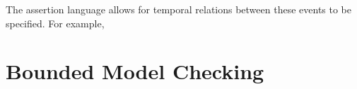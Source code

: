 The assertion language allows for temporal relations between these events to be
specified. For example,

\section{Bounded Model Checking}

\iffalse

\begin{figure}[ht]
  \centering
  \begin{tikzpicture}[>=latex',initial text={},
                      node distance=3cm,on grid,auto]
    \node[state,initial,accepting] (only) [] {};
    \node [draw,dashed,fit=(only),inner sep=0.3cm] {};
  \end{tikzpicture}
  \caption{Null Assertion}
  \label{fig:gv}
\end{figure}

\begin{figure}[ht]
  \centering
  \begin{tikzpicture}[>=latex',initial text={},
                      node distance=3cm,on grid,auto]
    \node[state,initial] (start) [] {};
    \node[state,accepting] (end) [right=of start] {};
    \node[draw,dashed,fit=(start) (end), inner sep=0.3cm] {};
    \path[->] (start) edge node {event} (end);
  \end{tikzpicture}
  \caption{Single Event Automaton}
  \label{fig:gv}
\end{figure}

\begin{figure}[ht]
  \centering
  \begin{tikzpicture}[>=latex',initial text={},
                      node distance=3cm,on grid,auto]
    \node[state,initial] (start) [] {};
    \node[state,accepting] (end) [right=of start] {};
    \node[draw,dashed,fit=(start) (end), inner sep=0.3cm] {};
    \path[->] (start) edge node {event} (end);
  \end{tikzpicture}
  \caption{Single Event Automaton}
  \label{fig:gv}
\end{figure}

\fi
